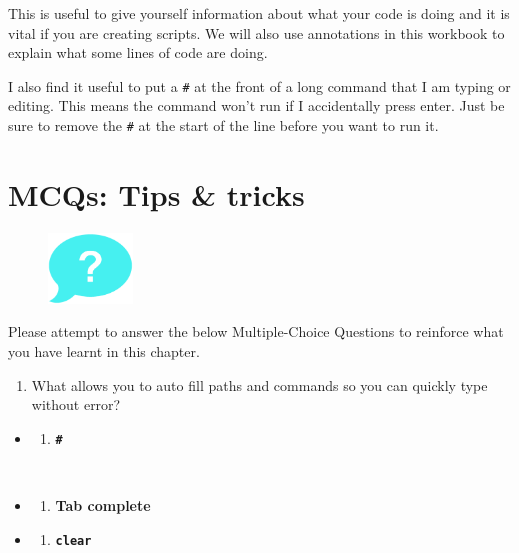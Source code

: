 \documentclass[
  letterpaper,
  DIV=11,
  numbers=noendperiod]{scrreprt}
\providecommand{\tightlist}{%
  \setlength{\itemsep}{0pt}\setlength{\parskip}{0pt}}\usepackage{longtable,booktabs,array}
\begin{document}
This is useful to give yourself information about what your code is
doing and it is vital if you are creating scripts. We will also use
annotations in this workbook to explain what some lines of code are
doing.

I also find it useful to put a \texttt{\#} at the front of a long
command that I am typing or editing. This means the command won't run if
I accidentally press enter. Just be sure to remove the \texttt{\#} at
the start of the line before you want to run it.

\hypertarget{mcqs-tips-tricks}{%
\section{MCQs: Tips \& tricks}\label{mcqs-tips-tricks}}

\begin{figure}

{\centering \includegraphics[width=0.2\textwidth,height=\textheight]{figures/question_bubble_blue.png}

}

\end{figure}

Please attempt to answer the below Multiple-Choice Questions to
reinforce what you have learnt in this chapter.

\begin{enumerate}
\def\labelenumi{\arabic{enumi}.}
\tightlist
\item
  What allows you to auto fill paths and commands so you can quickly
  type without error?
\end{enumerate}

\begin{itemize}
\item
  \begin{enumerate}
  \def\labelenumi{(\Alph{enumi})}
  \tightlist
  \item
    \textbf{\texttt{\#}}\strut \\
  \end{enumerate}
\item
  \begin{enumerate}
  \def\labelenumi{(\Alph{enumi})}
  \setcounter{enumi}{1}
  \tightlist
  \item
    \textbf{Tab complete}\\
  \end{enumerate}
\item
  \begin{enumerate}
  \def\labelenumi{(\Alph{enumi})}
  \setcounter{enumi}{2}
  \tightlist
  \item
    \textbf{\texttt{clear}}
  \end{enumerate}
\end{itemize}
\end{document}
